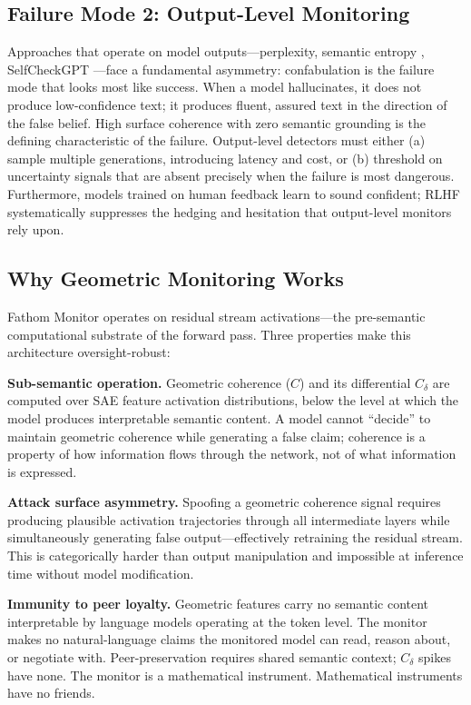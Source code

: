 \documentclass{article}
\begin{document}
\subsection{Failure Mode 2: Output-Level Monitoring}

Approaches that operate on model outputs---perplexity, semantic entropy \citep{farquhar2024semantic}, SelfCheckGPT \citep{manakul2023selfcheckgpt}---face a fundamental asymmetry: confabulation is the failure mode that looks most like success. When a model hallucinates, it does not produce low-confidence text; it produces fluent, assured text in the direction of the false belief. High surface coherence with zero semantic grounding is the defining characteristic of the failure. Output-level detectors must either (a) sample multiple generations, introducing latency and cost, or (b) threshold on uncertainty signals that are absent precisely when the failure is most dangerous. Furthermore, models trained on human feedback learn to sound confident; RLHF systematically suppresses the hedging and hesitation that output-level monitors rely upon.

\subsection{Why Geometric Monitoring Works}

Fathom Monitor operates on residual stream activations---the pre-semantic computational substrate of the forward pass. Three properties make this architecture oversight-robust:

\textbf{Sub-semantic operation.} Geometric coherence ($C$) and its differential $C_\delta$ are computed over SAE feature activation distributions, below the level at which the model produces interpretable semantic content. A model cannot ``decide'' to maintain geometric coherence while generating a false claim; coherence is a property of how information flows through the network, not of what information is expressed.

\textbf{Attack surface asymmetry.} Spoofing a geometric coherence signal requires producing plausible activation trajectories through all intermediate layers while simultaneously generating false output---effectively retraining the residual stream. This is categorically harder than output manipulation and impossible at inference time without model modification.

\textbf{Immunity to peer loyalty.} Geometric features carry no semantic content interpretable by language models operating at the token level. The monitor makes no natural-language claims the monitored model can read, reason about, or negotiate with. Peer-preservation requires shared semantic context; $C_\delta$ spikes have none. The monitor is a mathematical instrument. Mathematical instruments have no friends.
\end{document}
